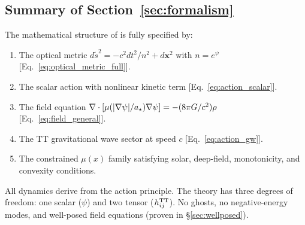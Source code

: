 \subsection{Summary of Section~\ref{sec:formalism}}

The mathematical structure of \DFD is fully specified by:
\begin{enumerate}
\item The optical metric $d\tilde{s}^2 = -c^2dt^2/n^2 + d\mathbf{x}^2$ 
with $n = e^\psi$ [Eq.~\eqref{eq:optical_metric_full}].
\item The scalar action with nonlinear kinetic term 
[Eq.~\eqref{eq:action_scalar}].
\item The field equation 
$\nabla\cdot[\mu(|\nabla\psi|/a_\star)\nabla\psi] = -(8\pi G/c^2)\rho$ 
[Eq.~\eqref{eq:field_general}].
\item The TT gravitational wave sector at speed $c$ 
[Eq.~\eqref{eq:action_gw}].
\item The constrained $\mu(x)$ family satisfying solar, deep-field, 
monotonicity, and convexity conditions.
\end{enumerate}

All dynamics derive from the action principle. The theory has three 
degrees of freedom: one scalar ($\psi$) and two tensor ($h_{ij}^{\rm TT}$). 
No ghosts, no negative-energy modes, and well-posed field equations 
(proven in \S\ref{sec:wellposed}).
